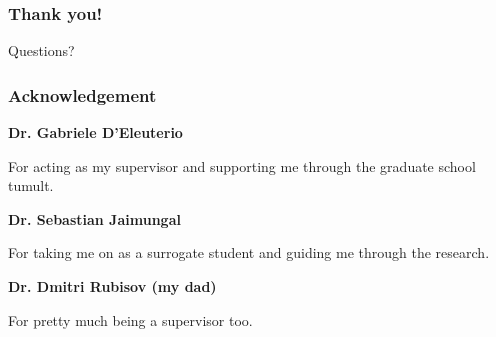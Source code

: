 \begin{frame}
\frametitle{Thank you!}

\begin{center}
Questions?
\end{center}

\end{frame}

\begin{frame}
\frametitle{Acknowledgement}
{\bf Dr. Gabriele D'Eleuterio \par}
For acting as my supervisor and supporting me through the graduate school tumult.\par 
\vspace{\baselineskip}
{\bf Dr. Sebastian Jaimungal \par}
For taking me on as a surrogate student and guiding me through the research.\par 
\vspace{\baselineskip}
{\bf Dr. Dmitri Rubisov (my dad) \par} 
For pretty much being a supervisor too.

\end{frame}
